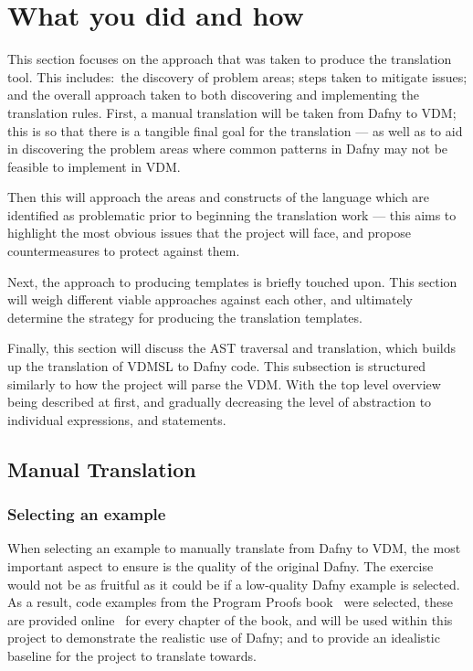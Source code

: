 \documentclass{entcs}
\begin{document}
\section{What you did and how}\label{section:approach}

This section focuses on the approach that was taken to produce the translation tool. This includes:~the discovery of problem areas; steps taken to mitigate issues; and the overall approach taken to both discovering and implementing the translation rules. First, a manual translation will be taken from Dafny to VDM; this is so that there is a tangible final goal for the translation --- as well as to aid in discovering the problem areas where common patterns in Dafny may not be feasible to implement in VDM. 

Then this will approach the areas and constructs of the language which are identified as problematic prior to beginning the translation work --- this aims to highlight the most obvious issues that the project will face, and propose countermeasures to protect against them.

Next, the approach to producing templates is briefly touched upon. This section will weigh different viable approaches against each other, and ultimately determine the strategy for producing the translation templates.

Finally, this section will discuss the AST traversal and translation, which builds up the translation of VDMSL to Dafny code. This subsection is structured similarly to how the project will parse the VDM. With the top level overview being described at first, and gradually decreasing the level of abstraction to individual expressions, and statements.

\subsection{Manual Translation}\label{section:manual_translation}

\subsubsection{Selecting an example}

When selecting an example to manually translate from Dafny to VDM, the most important aspect to ensure is the quality of the original Dafny. The exercise would not be as fruitful as it could be if a low-quality Dafny example is selected. As a result, code examples from the Program Proofs book~\cite{ProgramProofs} were selected, these are provided online~\cite{ProgProofsCodeExamples} for every chapter of the book, and will be used within this project to demonstrate the realistic use of Dafny; and to provide an idealistic baseline for the project to translate towards.
\end{document}
